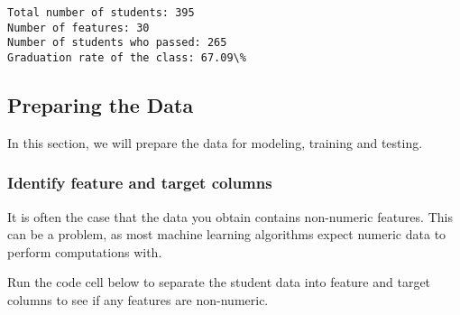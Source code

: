 \documentclass[11pt]{article}
\begin{document}
    \begin{Verbatim}[commandchars=\\\{\}]
Total number of students: 395
Number of features: 30
Number of students who passed: 265
Graduation rate of the class: 67.09\%

    \end{Verbatim}

    \subsection{Preparing the Data}\label{preparing-the-data}

In this section, we will prepare the data for modeling, training and
testing.

\subsubsection{Identify feature and target
columns}\label{identify-feature-and-target-columns}

It is often the case that the data you obtain contains non-numeric
features. This can be a problem, as most machine learning algorithms
expect numeric data to perform computations with.

Run the code cell below to separate the student data into feature and
target columns to see if any features are non-numeric.
\end{document}
